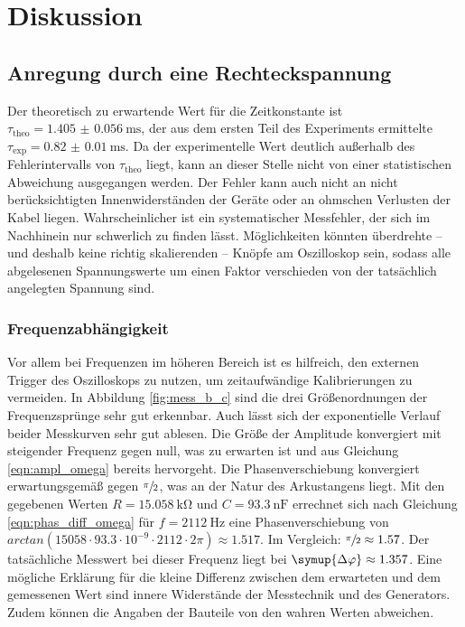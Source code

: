 \section{Diskussion}
\label{sec:Diskussion}

\subsection{Anregung durch eine Rechteckspannung}

Der theoretisch zu erwartende Wert für die Zeitkonstante ist $\tau _\text{theo}=\SI{1.405(56)}{\milli\second}$, der aus dem 
ersten Teil des Experiments ermittelte ${\tau _\text{exp}=\SI{0.82(1)}{\milli\second}}$. 
Da der experimentelle Wert deutlich außerhalb des Fehlerintervalls von $\tau _\text{theo}$ liegt, kann an dieser Stelle 
nicht von einer statistischen Abweichung ausgegangen werden. 
Der Fehler kann auch nicht an nicht berücksichtigten Innenwiderständen der Geräte oder an ohmschen Verlusten der Kabel 
liegen. 
Wahrscheinlicher ist ein systematischer Messfehler, der sich im Nachhinein nur schwerlich zu finden lässt. 
Möglichkeiten könnten überdrehte -- und deshalb keine richtig skalierenden -- Knöpfe am Oszilloskop sein, sodass alle 
abgelesenen Spannungswerte um einen Faktor verschieden von der tatsächlich angelegten Spannung sind. 

\subsubsection{Frequenzabhängigkeit}
Vor allem bei Frequenzen im höheren Bereich ist es hilfreich, den externen Trigger des Oszilloskops zu nutzen, um zeitaufwändige Kalibrierungen zu vermeiden.
In Abbildung \ref{fig:mess_b_c} sind die drei Größenordnungen der Frequenzsprünge sehr gut erkennbar. Auch lässt sich der exponentielle Verlauf beider Messkurven
sehr gut ablesen. Die Größe der Amplitude konvergiert mit steigender Frequenz gegen null, was zu erwarten ist und aus Gleichung \eqref{eqn:ampl_omega} bereits hervorgeht.
Die Phasenverschiebung konvergiert erwartungsgemäß gegen $\sfrac{\pi}{2}$, was an der Natur des Arkustangens liegt.
Mit den gegebenen Werten $R = \SI{15.058}{\kilo\ohm}$ und $C = \SI{93.3}{\nano\farad}$ errechnet sich nach Gleichung \eqref{eqn:phas_diff_omega} für $f = \SI{2112}{\hertz}$ eine Phasenverschiebung
von $arctan(15058\cdot93.3\cdot10^{-9}\cdot2112\cdot2\pi) \approx 1.517$. Im Vergleich: $\sfrac{\pi}{2} \approx 1.57$. Der tatsächliche Messwert bei dieser Frequenz liegt bei 
$\symup{\Delta\varphi} \approx 1.357$. Eine mögliche Erklärung für die kleine Differenz zwischen dem erwarteten und dem gemessenen Wert sind innere Widerstände
der Messtechnik und des Generators. Zudem können die Angaben der Bauteile von den wahren Werten abweichen.

